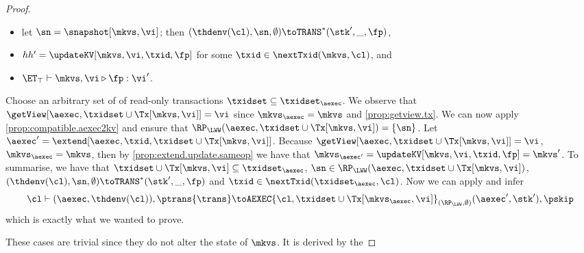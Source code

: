 \begin{proof}
\begin{itemize}
\item let $\sn = \snapshot[\mkvs, \vi]$; then $(\thdenv(\cl), \sn, \emptyset) \toTRANS^{\ast} (\stk', \_, \fp)$, 
\item $hh' = \updateKV[\mkvs, \vi, \txid, \fp]$ for some $\txid \in \nextTxid(\mkvs, \cl)$, and
\item $\ET_{\top} \vdash \mkvs, \vi \triangleright \fp: \vi'$.
\end{itemize}
Choose an arbitrary set of of read-only transactions $\txidset \subseteq \txidset_{\aexec}$.
We observe that $\getView[\aexec, \txidset \cup \Tx[\mkvs, \vi]] = \vi$ since $\mkvs_{\aexec} = \mkvs$ and \cref{prop:getview.tx}.
We can now apply \cref{prop:compatible.aexec2kv} and ensure that $\RP_{\LWW}(\aexec, \txidset \cup \Tx[\mkvs, \vi]) = \{\sn\}$.
Let $\aexec' = \extend[\aexec, \txid, \txidset \cup \Tx[\mkvs, \vi]]$. 
Because $\getView[\aexec, \txidset \cup \Tx[\mkvs, \vi]] = \vi$, $\mkvs_{\aexec} = \mkvs$,
then by \cref{prop:extend.update.sameop} we have that $\mkvs_{\aexec'} = \updateKV[\mkvs, \vi, \txid, \fp] = \mkvs'$. 
To summarise, we have that $\txidset \cup \Tx[\mkvs, \vi] \subseteq \txidset_{\aexec}$, $\sn \in \RP_{\LWW}(\aexec, \txidset \cup \Tx[\mkvs, \vi])$,
$(\thdenv(\cl), \sn, \emptyset) \toTRANS^{\ast} (\stk', \_, \fp)$ and $\txid \in \nextTxid(\txidset_{\aexec}, \cl)$. 
Now we can apply  and infer
\[
\cl \vdash (\aexec, \thdenv(\cl)), \ptrans{\trans} \toAEXEC{\cl, \txidset \cup \Tx[\mkvs_{\aexec}, \vi]}_{(\RP_{\LWW}, \emptyset)} 
(\aexec', \stk'), \pskip
\]
which is exactly what we wanted to prove. 

These cases are trivial since they do not alter the state of \( \mkvs \).
It is derived by the \ih
\end{proof}

